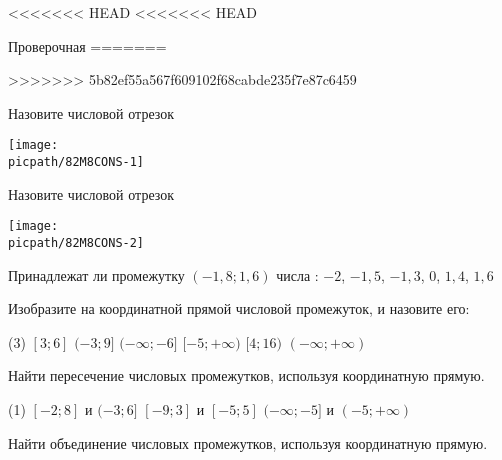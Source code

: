 \begin{exam}
	\begin{listofex}
<<<<<<< HEAD
<<<<<<< HEAD
		\item Проверочная
=======
		\item 
>>>>>>> 5b82ef55a567f609102f68cabde235f7e87c6459
	\end{listofex}
\end{exam}

\begin{consultation}[number=1]
	\begin{listofex}
		\item 
		\begin{minipage}[t]{\bodywidth}
			Назовите числовой отрезок
		\end{minipage}
		\hspace{0.02\linewidth}
		\begin{minipage}[t]{\picwidth}
			\texttt{[image: \\picpath/82M8CONS-1]}
		\end{minipage}
		\item 
		\begin{minipage}[t]{\bodywidth}
			Назовите числовой отрезок
		\end{minipage}
		\hspace{0.02\linewidth}
		\begin{minipage}[t]{\picwidth}
			\texttt{[image: \\picpath/82M8CONS-2]}
		\end{minipage}
		\item Принадлежат ли промежутку \( (-1,8;1,6) \) числа : \( -2 \), \( -1,5 \), \( -1,3 \), \( 0 \), \( 1,4 \), \( 1,6 \)
		\item Изобразите на координатной прямой числовой промежуток, и назовите его:
		\begin{tasks}(3)
			\task \( [3;6] \)
			\task \( (-3;9] \)
			\task \( (-\infty;-6] \)
			\task \( [-5;+\infty) \)
			\task \( [4;16) \)
			\task \( (-\infty;+\infty )\)
		\end{tasks}
		\item Найти пересечение числовых промежутков, используя координатную прямую.
		\begin{tasks}(1)
			\task \( [-2;8] \) и \( (-3;6] \)
			\task \( [-9;3] \) и \( [-5;5] \)
			\task \( (-\infty;-5] \) и \( (-5;+\infty) \)
		\end{tasks}
		\item Найти объединение числовых промежутков, используя координатную прямую.

\end{listofex}
\end{consultation}
